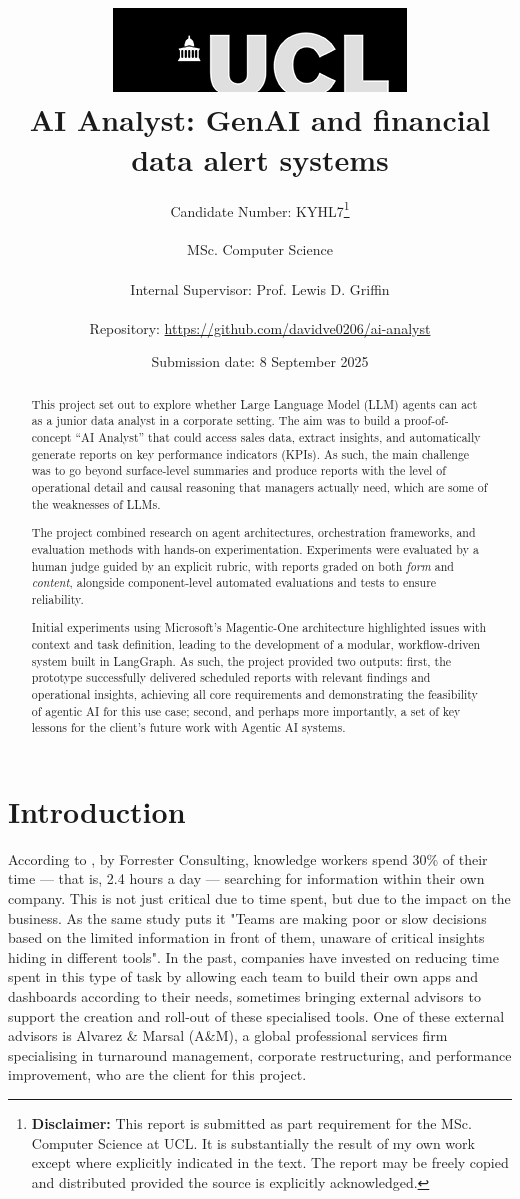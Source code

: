 \documentclass[a4paper]{report}
\title{{\vspace{-14em} \includegraphics[scale=0.4]{images/ucl_logo.png}}\\
{{\Huge AI Analyst: GenAI and financial data alert systems}}\\
}
\date{Submission date: 8 September 2025}
\author{Candidate Number: KYHL7\thanks{
{\bf Disclaimer:}
This report is submitted as part requirement for the MSc. Computer Science at UCL. It is substantially the result of my own work except where explicitly indicated in the text. The report may be freely copied and distributed provided the source is explicitly acknowledged.}
\\ \\
MSc. Computer Science\\ \\
Internal Supervisor: Prof. Lewis D. Griffin\\ \\
Repository: \url{https://github.com/davidve0206/ai-analyst}}
\begin{document}
 
\onehalfspacing

\maketitle


\tableofcontents

\setcounter{page}{1}
\begin{abstract}
This project set out to explore whether Large Language Model (LLM) agents can act as a junior data analyst in a corporate setting. The aim was to build a proof-of-concept “AI Analyst” that could access sales data, extract insights, and automatically generate reports on key performance indicators (KPIs). As such, the main challenge was to go beyond surface-level summaries and produce reports with the level of operational detail and causal reasoning that managers actually need, which are some of the weaknesses of LLMs.

The project combined research on agent architectures, orchestration frameworks, and evaluation methods with hands-on experimentation. Experiments were evaluated by a human judge guided by an explicit rubric, with reports graded on both \textit{form} and \textit{content}, alongside component-level automated evaluations and tests to ensure reliability.

Initial experiments using Microsoft’s Magentic-One architecture highlighted issues with context and task definition, leading to the development of a modular, workflow-driven system built in LangGraph. As such, the project provided two outputs: first, the prototype successfully delivered scheduled reports with relevant findings and operational insights, achieving all core requirements and demonstrating the feasibility of agentic AI for this use case; second, and perhaps more importantly, a set of key lessons for the client's future work with Agentic AI systems.
\end{abstract}

\chapter{Introduction}
\label{chapter:introduction}

According to \cite{forrester2022}, by Forrester Consulting, knowledge workers spend 30\% of their time --- that is, 2.4 hours a day --- searching for information within their own company. This is not just critical due to time spent, but due to the impact on the business. As the same study puts it "Teams are making poor or slow decisions based on the limited information in front of them, unaware of critical insights hiding in different tools". In the past, companies have invested on reducing time spent in this type of task by allowing each team to build their own apps and dashboards according to their needs, sometimes bringing external advisors to support the creation and roll-out of these specialised tools. One of these external advisors is Alvarez \& Marsal (A\&M), a global professional services firm specialising in turnaround management, corporate restructuring, and performance improvement, who are the client for this project.
\end{document}
